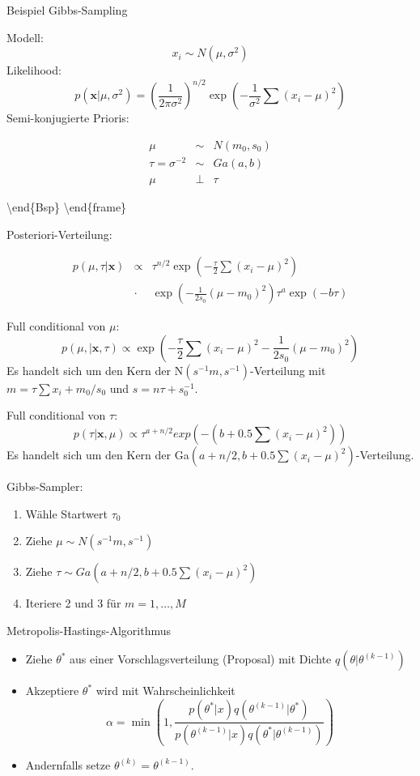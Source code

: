 \documentclass[ignorenonframetext,]{beamer}
\providecommand{\tightlist}{%
\setlength{\itemsep}{0pt}\setlength{\parskip}{0pt}}
\begin{document}
\begin{frame}[allowframebreaks]{Beispiel Gibbs-Sampling}

Modell: \[x_i \sim N(\mu, \sigma^2)\] Likelihood:
\[p(\bm{x}|\mu,\sigma^2) = \left(
\frac{1}{2\pi\sigma^2}\right)^{n/2} 
\exp\left(-\frac{1}{\sigma^2}\sum (x_i-\mu)^2\right)\] Semi-konjugierte
Prioris:

\begin{eqnarray*}
\mu &\sim& N(m_0,s_0)\\
\tau=\sigma^{-2} &\sim& Ga(a,b)\\
\mu &\perp &\tau
\end{eqnarray*}

\textbackslash{}end\{Bsp\} \textbackslash{}end\{frame\}

Posteriori-Verteilung:

\begin{eqnarray*}
p(\mu,\tau|\bm{x}) &\propto& \tau^{n/2} 
\exp\left(-\frac{\tau}{2}\sum (x_i-\mu)^2\right) \\
&\cdot& \exp\left(-\frac{1}{2s_0}(\mu-m_0)^2\right) \tau^a \exp(-b\tau)
\end{eqnarray*}

Full conditional von \(\mu\): \[
p(\mu,|\bm{x},\tau) \propto
\exp\left(-\frac{\tau}{2}\sum (x_i-\mu)^2-\frac{1}{2s_0}(\mu-m_0)^2\right) 
\] Es handelt sich um den Kern der N\((s^{-1}m,s^{-1})\)-Verteilung mit
\(m=\tau\sum x_i+m_0/s_0\) und \(s=n\tau+s_0^{-1}\).

Full conditional von \(\tau\): \[
p(\tau|\bm{x},\mu) \propto
\tau^{a+n/2}  exp\left(-(b+0.5\sum(x_i-\mu)^2)\right) 
\] Es handelt sich um den Kern der
Ga\((a+n/2,b+0.5\sum(x_i-\mu)^2)\)-Verteilung.

Gibbs-Sampler:

\begin{enumerate}
\def\labelenumi{\arabic{enumi}.}
\tightlist
\item
  Wähle Startwert \(\tau_0\)
\item
  Ziehe \(\mu \sim N(s^{-1}m,s^{-1})\)
\item
  Ziehe \(\tau \sim Ga(a+n/2,b+0.5\sum(x_i-\mu)^2)\)
\item
  Iteriere 2 und 3 für \(m=1,\ldots,M\)
\end{enumerate}

\end{frame}

\begin{frame}{Metropolis-Hastings-Algorithmus}

\begin{itemize}
\item Ziehe $\theta^*$ aus einer Vorschlagsverteilung (Proposal) mit Dichte $q(\theta|\theta^{(k-1)})$
\item Akzeptiere $\theta^*$ wird mit Wahrscheinlichkeit
\[
\alpha=\min\left(1,\frac{p(\theta^*|x)q(\theta^{(k-1)}|\theta^*)}{p(\theta^{(k-1)}|x)q(\theta^*|\theta^{(k-1)})}\right)
\]
\item Andernfalls setze $\theta^{(k)}=\theta^{(k-1)}.$
\end{itemize}

\end{frame}
\end{document}
